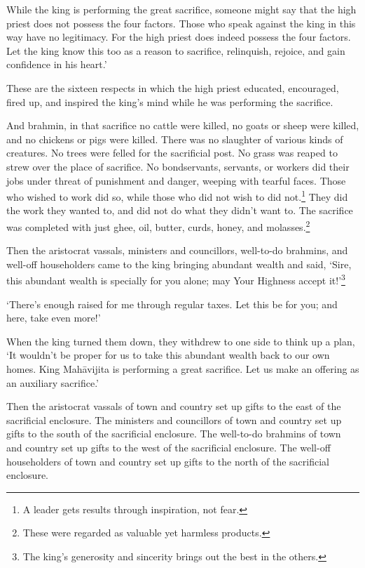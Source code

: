 \documentclass[12pt,openany]{book}%
\begin{document}
While the king is performing the great sacrifice, someone might say that the high priest does not possess the four factors. Those who speak against the king in this way have no legitimacy. For the high priest does indeed possess the four factors. Let the king know this too as a reason to sacrifice, relinquish, rejoice, and gain confidence in his heart.’ 

These are the sixteen respects in which the high priest educated, encouraged, fired up, and inspired the king’s mind while he was performing the sacrifice. 

And brahmin, in that sacrifice no cattle were killed, no goats or sheep were killed, and no chickens or pigs were killed. There was no slaughter of various kinds of creatures. No trees were felled for the sacrificial post. No grass was reaped to strew over the place of sacrifice. No bondservants, servants, or workers did their jobs under threat of punishment and danger, weeping with tearful faces. Those who wished to work did so, while those who did not wish to did not.\footnote{A leader gets results through inspiration, not fear. } They did the work they wanted to, and did not do what they didn’t want to. The sacrifice was completed with just ghee, oil, butter, curds, honey, and molasses.\footnote{These were regarded as valuable yet harmless products. } 

Then the aristocrat vassals, ministers and councillors, well-to-do brahmins, and well-off householders came to the king bringing abundant wealth and said, ‘Sire, this abundant wealth is specially for you alone; may Your Highness accept it!’\footnote{The king’s generosity and sincerity brings out the best in the others. } 

‘There’s enough raised for me through regular taxes. Let this be for you; and here, take even more!’ 

When the king turned them down, they withdrew to one side to think up a plan, ‘It wouldn’t be proper for us to take this abundant wealth back to our own homes. King \textsanskrit{Mahāvijita} is performing a great sacrifice. Let us make an offering as an auxiliary sacrifice.’ 

Then the aristocrat vassals of town and country set up gifts to the east of the sacrificial enclosure. The ministers and councillors of town and country set up gifts to the south of the sacrificial enclosure. The well-to-do brahmins of town and country set up gifts to the west of the sacrificial enclosure. The well-off householders of town and country set up gifts to the north of the sacrificial enclosure. 
\end{document}
